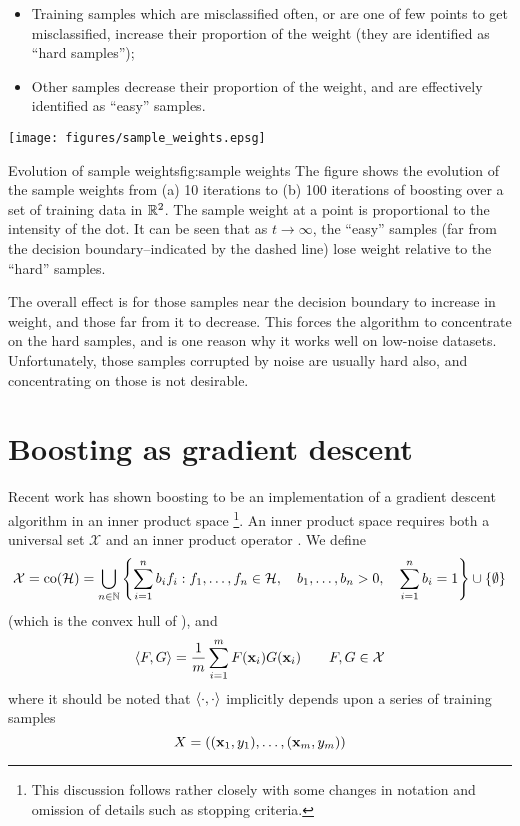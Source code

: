 \begin{itemize}
\item	Training samples which are misclassified often, or are one of 
	few points to get misclassified, increase their proportion of
	the weight (they are identified as ``hard samples'');
\item	Other samples decrease their proportion of the weight, and are
	effectively identified as ``easy'' samples.
\end{itemize}

\begin{linefigure}
\begin{center}
\texttt{[image: figures/sample\_weights.epsg]}
\end{center}
\begin{capt}{Evolution of sample weights}{fig:sample weights}
The figure shows the evolution of the sample weights from (a) 10
iterations to (b) 100 iterations of boosting over a set of training
data in $\mathbb{R}^2$.  The sample weight at a point is proportional to the
intensity of the dot.  It can be seen that as $t \rightarrow \infty$,
the ``easy'' samples (far from the decision boundary--indicated by the
dashed line) lose weight relative to the ``hard'' samples.
\end{capt}
\end{linefigure}

The overall effect is for those samples near the decision boundary to
increase in weight, and those far from it to decrease.  This forces
the algorithm to concentrate on the hard samples, and is one reason
why it works well on low-noise datasets.  Unfortunately, those samples
corrupted by noise are usually hard also, and concentrating on those
is not desirable.


\section{Boosting as gradient descent}
\label{sec:theory:gradient descent}

Recent work has shown boosting to be an implementation of a gradient
descent algorithm in an inner product space \cite{Mason99}%
\footnote{This discussion follows \cite{Mason99} rather closely with
some changes in notation and omission of details such as stopping
criteria.}.
An inner product space requires both a universal set $\mathcal{X}$ and
an inner product operator \ip{\cdot}{\cdot}.  We define
%
\begin{equation}
\mathcal{X} = 
\mathrm{co} (\mathcal{H}) =
 \bigcup _{n \in \mathbb{N}}
\left\{
 \sum_{i=1}^{n}
  b_i
f_i : f_1, \ldots, f_n \in \mathcal{H}, \quad
 b_1, \ldots, b_n > 0, \quad
 \sum_{i=1}^{n} b_i = 1
\right\} \cup \{ \emptyset \}
\end{equation}
%
(which is the convex hull of \calH), and
%
\begin{equation}
\langle {F} , {G} \rangle = \frac{1}{m} \sum_{i=1}^{m} F(\mathbf{x}_i)G(\mathbf{x}_i) \qquad
F, G \in \mathcal{X}
\label{eqn:inner product definition}
\end{equation}
%
where it should be noted that $\langle {\cdot} , {\cdot} \rangle$ implicitly depends
upon a series of training samples
%
\begin{equation}
X = ((\mathbf{x}_1, y_1), \ldots, (\mathbf{x}_m, y_m))
\end{equation}

